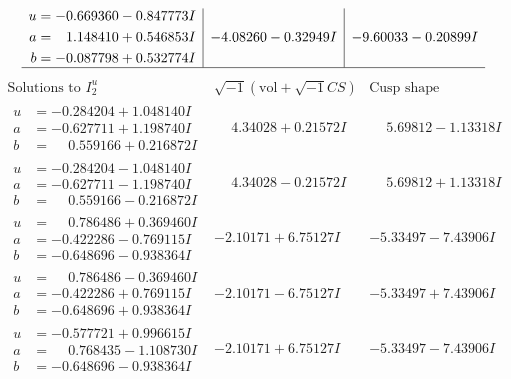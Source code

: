 \documentclass[1p]{elsarticle_modified}
\theoremstyle{definition}
\newcommand{\I}{\sqrt{-1}}
\begin{document}
$$\begin{array}{c|c|c}
\begin{aligned}
u &= -0.669360 - 0.847773 I \\
a &= \phantom{-}1.148410 + 0.546853 I \\
b &= -0.087798 + 0.532774 I\end{aligned}
 & -4.08260 - 0.32949 I & -9.60033 - 0.20899 I\\
 \hline 
 \end{array}$$\newpage$$\begin{array}{c|c|c}  
\text{Solutions to }I^u_{2}& \I (\text{vol} + \sqrt{-1}CS) & \text{Cusp shape}\\
 \hline 
\begin{aligned}
u &= -0.284204 + 1.048140 I \\
a &= -0.627711 + 1.198740 I \\
b &= \phantom{-}0.559166 + 0.216872 I\end{aligned}
 & \phantom{-}4.34028 + 0.21572 I & \phantom{-}5.69812 - 1.13318 I \\ \hline\begin{aligned}
u &= -0.284204 - 1.048140 I \\
a &= -0.627711 - 1.198740 I \\
b &= \phantom{-}0.559166 - 0.216872 I\end{aligned}
 & \phantom{-}4.34028 - 0.21572 I & \phantom{-}5.69812 + 1.13318 I \\ \hline\begin{aligned}
u &= \phantom{-}0.786486 + 0.369460 I \\
a &= -0.422286 - 0.769115 I \\
b &= -0.648696 - 0.938364 I\end{aligned}
 & -2.10171 + 6.75127 I & -5.33497 - 7.43906 I \\ \hline\begin{aligned}
u &= \phantom{-}0.786486 - 0.369460 I \\
a &= -0.422286 + 0.769115 I \\
b &= -0.648696 + 0.938364 I\end{aligned}
 & -2.10171 - 6.75127 I & -5.33497 + 7.43906 I \\ \hline\begin{aligned}
u &= -0.577721 + 0.996615 I \\
a &= \phantom{-}0.768435 - 1.108730 I \\
b &= -0.648696 - 0.938364 I\end{aligned}
 & -2.10171 + 6.75127 I & -5.33497 - 7.43906 I \\ \hline\begin{aligned}

\end{aligned}
\end{array}$$
\end{document}
